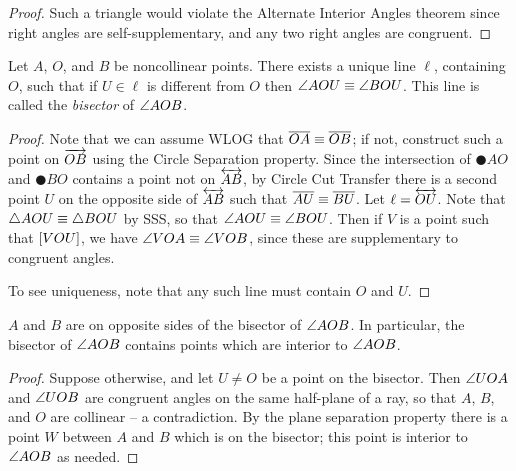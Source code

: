 \begin{proof}
Such a triangle would violate the Alternate Interior Angles theorem since right angles are self-supplementary, and any two right angles are congruent.
\end{proof}


\begin{construct}
Let \(A\), \(O\), and \(B\) be noncollinear points.
There exists a unique line \(\ell\), containing \(O\), such that if \(U \in \ell\) is different from \(O\) then \(\angle{AOU} \equiv \angle{BOU}\).
This line is called the \emph{bisector} of \(\angle{AOB}\).
\end{construct}

\begin{proof}
Note that we can assume WLOG that \(\overline{OA} \equiv \overline{OB}\); if not, construct such a point on \(\overrightarrow{OB}\) using the Circle Separation property.
Since the intersection of \(\CIRCLE{A}{O}\) and \(\CIRCLE{B}{O}\) contains a point not on \(\overleftrightarrow{AB}\), by Circle Cut Transfer there is a second point \(U\) on the opposite side of \(\overleftrightarrow{AB}\) such that \(\overline{AU} \equiv \overline{BU}\).
Let \(\ell = \overleftrightarrow{OU}\).
Note that \(\bigtriangleup{AOU} \equiv \bigtriangleup{BOU}\) by SSS, so that \(\angle{AOU} \equiv \angle{BOU}\).
Then if \(V\) is a point such that \([ V O U ]\), we have \(\angle{VOA} \equiv \angle{VOB}\), since these are supplementary to congruent angles.

To see uniqueness, note that any such line must contain \(O\) and \(U\).
\end{proof}

\begin{cor}
\(A\) and \(B\) are on opposite sides of the bisector of \(\angle{AOB}\).
In particular, the bisector of \(\angle{AOB}\) contains points which are interior to \(\angle{AOB}\).
\end{cor}

\begin{proof}
Suppose otherwise, and let \(U \neq O\) be a point on the bisector.
Then \(\angle{UOA}\) and \(\angle{UOB}\) are congruent angles on the same half-plane of a ray, so that \(A\), \(B\), and \(O\) are collinear -- a contradiction.
By the plane separation property there is a point \(W\) between \(A\) and \(B\) which is on the bisector; this point is interior to \(\angle{AOB}\) as needed.
\end{proof}

